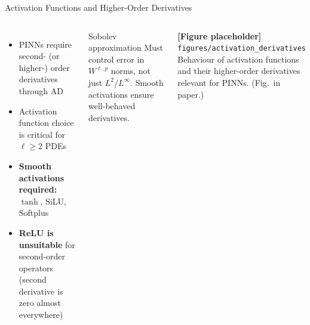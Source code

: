 \documentclass[aspectratio=169,10pt]{beamer}
\newcommand{\figph}[2]{%
  \par\smallskip
  \noindent\colorbox{gray!10}{\parbox{0.88\linewidth}{%
    \centering\smallskip
    \textbf{\color{gray!70}[Figure placeholder]}\\[3pt]%
    {\footnotesize\color{gray!60}\nolinkurl{#1}}\\[3pt]%
    {\small\color{gray!60}#2}\smallskip}}%
  \par\smallskip}
\begin{document}
\begin{frame}{Activation Functions and Higher-Order Derivatives}
  \begin{columns}[T]
      \begin{itemize}
        \item PINNs require second- (or higher-) order derivatives through AD
        \item Activation function choice is critical for $\ell \ge 2$ PDEs
        \item \textbf{Smooth activations required:} $\tanh$, SiLU, Softplus
        \item \textbf{ReLU is unsuitable} for second-order operators
              (second derivative is zero almost everywhere)
      \end{itemize}
      \vspace{0.3cm}
      \begin{alertblock}{Sobolev approximation}
        Must control error in $W^{\ell,p}$ norms, not just $L^2/L^\infty$.
        Smooth activations ensure well-behaved derivatives.
      \end{alertblock}
      \centering
      \figph{figures/activation_derivatives}{Behaviour of activation
        functions and their higher-order derivatives relevant for PINNs.
        (Fig.~in paper.)}
  \end{columns}
\end{frame}
\end{document}
